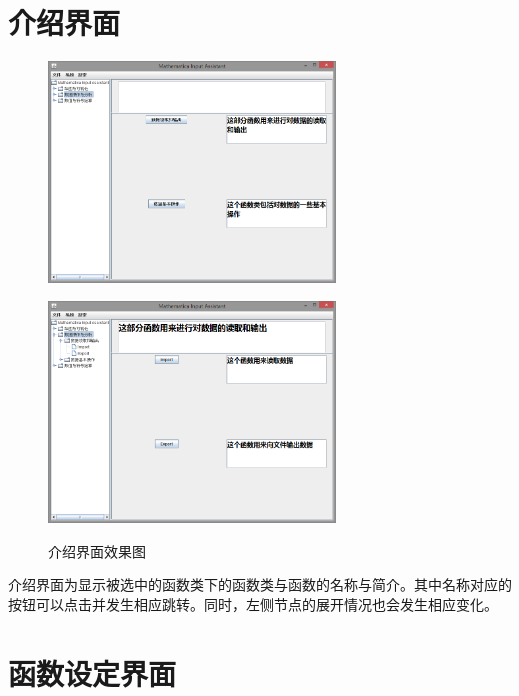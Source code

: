 \documentclass[hyperref, UTF8
,bookmarksnumbered=true, oneside]{ctexbook}
\begin{document}

	\section{介绍界面} %

		\begin{figure}[!h]
			\begin{minipage}[b]{0.45\textwidth}
			\centering
			\includegraphics[width=3in]{Right01.png}
			\label{pic:MathPack}
			\end{minipage}%
			\hspace{0.1\textwidth}%
			\begin{minipage}[b]{0.45\textwidth}
			\centering
			\includegraphics[width=3in]{Right02.png}
			\label{pic:GUIPack}
			\end{minipage}
			\caption{介绍界面效果图}
		\end{figure}

		介绍界面为显示被选中的函数类下的函数类与函数的名称与简介。其中名称对应的按钮可以点击并发生相应跳转。同时，左侧节点的展开情况也会发生相应变化。


		

	\section{函数设定界面} %
\end{document}
